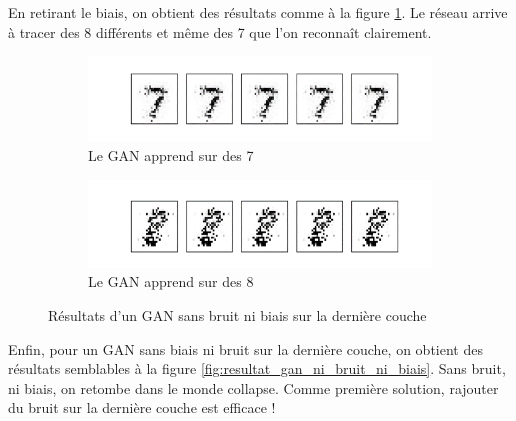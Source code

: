En retirant le biais, on obtient des résultats comme à la figure \ref{fig:resultat_gan_bruit_sans_biais}. Le réseau arrive à tracer des 8 différents et même des 7 que l'on reconnaît clairement.

\begin{figure}[h!]
  \centering
  \begin{subfigure}[b]{\linewidth}
    \includegraphics[width=\linewidth]{fig/resultatgannibruitnibiais7.png}
    \caption{Le GAN apprend sur des 7}
  \end{subfigure}
  \quad
  \begin{subfigure}[b]{\linewidth}
    \includegraphics[width=\linewidth]{fig/resultatgannibruitnibiais8.png}
    \caption{Le GAN apprend sur des 8}
  \end{subfigure}
  \caption{Résultats d'un GAN sans bruit ni biais sur la dernière couche}
  \label{fig:resultat_gan_bruit_sans_biais}
\end{figure}

Enfin, pour un GAN sans biais ni bruit sur la dernière couche, on obtient des résultats semblables à la figure \ref{fig:resultat_gan_ni_bruit_ni_biais}. Sans bruit, ni biais, on retombe dans le monde collapse. Comme première solution, rajouter du bruit sur la dernière couche est efficace !

